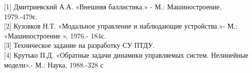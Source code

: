 [1] Дмитриевский А.А. «Внешняя баллистика.» - М.: Машиностроение,
1979.-479с. \\

[2] Кузовков Н.Т. «Модальное управление и наблюдающие
устройства.»- М.: «Машиностроение », 1976.- 184с. \\

[3] Техническое задание на разработку СУ ПТДУ. \\

[4] Крутько П.Д. «Обратные задачи динамики управляемых систем.
Нелинейные модели».- М.: Наука, 1988.-328 с
\clearpage